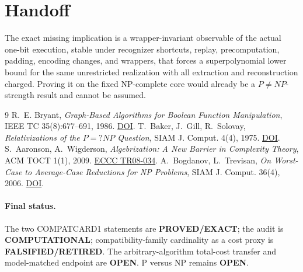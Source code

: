 \documentclass[11pt]{article}
\newcommand{\Status}[1]{\textbf{#1}}
\begin{document}
\section{Handoff}
The exact missing implication is a wrapper-invariant observable of the
actual one-bit execution, stable under recognizer shortcuts, replay,
precomputation, padding, encoding changes, and wrappers, that forces a
superpolynomial lower bound for the same unrestricted realization with all
extraction and reconstruction charged.  Proving it on the fixed NP-complete
core would already be a \(P\ne NP\)-strength result and cannot be assumed.

\begin{thebibliography}{9}
 R.~E. Bryant, \emph{Graph-Based Algorithms for Boolean
Function Manipulation}, IEEE TC 35(8):677--691, 1986.
\href{https://doi.org/10.1109/TC.1986.1676819}{DOI}.
 T.~Baker, J.~Gill, R.~Solovay,
\emph{Relativizations of the \(P=?NP\) Question}, SIAM J. Comput. 4(4), 1975.
\href{https://doi.org/10.1137/0204037}{DOI}.
 S.~Aaronson, A.~Wigderson, \emph{Algebrization: A New Barrier
in Complexity Theory}, ACM TOCT 1(1), 2009.
\href{https://eccc.weizmann.ac.il/report/2008/034/}{ECCC TR08-034}.
 A.~Bogdanov, L.~Trevisan, \emph{On Worst-Case to Average-Case
Reductions for NP Problems}, SIAM J. Comput. 36(4), 2006.
\href{https://doi.org/10.1137/S0097539705446974}{DOI}.
\end{thebibliography}

\paragraph{Final status.}
The two COMPATCARD1 statements are \Status{PROVED/EXACT}; the audit is
\Status{COMPUTATIONAL}; compatibility-family cardinality as a cost proxy is
\Status{FALSIFIED/RETIRED}.  The arbitrary-algorithm total-cost transfer and
model-matched endpoint are \Status{OPEN}.  P versus NP remains \Status{OPEN}.

\end{document}

